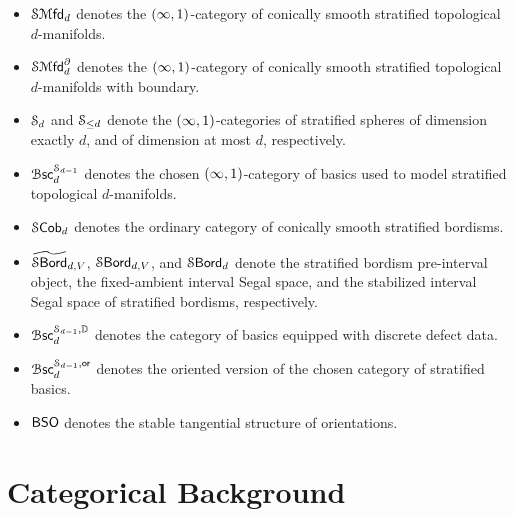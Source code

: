 \documentclass{amsbook}
\begin{document}
\begin{itemize}
    \item ${\mathcal S\!\operatorname{{\mathcal M}\mathsf{fd}}}_d$ denotes the $(\operatorname{\infty},1)$-category of conically smooth stratified topological $d$-manifolds.
    \item ${\mathcal S\!\operatorname{{\mathcal M}\mathsf{fd}}}_d^\partial$ denotes the $(\operatorname{\infty},1)$-category of conically smooth stratified topological $d$-manifolds with boundary.
    \item $\mathcal S_d$ and $\mathcal S_{\le d}$ denote the $(\operatorname{\infty},1)$-categories of stratified spheres of dimension exactly $d$, and of dimension at most $d$, respectively.
    \item $\operatorname{\mathcal B\mathsf{sc}}_d^{\mathcal S_{d-1}}$ denotes the chosen $(\operatorname{\infty},1)$-category of basics used to model stratified topological $d$-manifolds.
    \item $\mathcal S\mathsf{Cob}_d$ denotes the ordinary category of conically smooth stratified bordisms.
    \item $\operatorname{\widetilde{\mathcal S\mathsf{Bord}}}_{d,V}$, $\operatorname{\mathcal S\mathsf{Bord}}_{d,V}$, and $\operatorname{\mathcal S\mathsf{Bord}}_d$ denote the stratified bordism pre-interval object, the fixed-ambient interval Segal space, and the stabilized interval Segal space of stratified bordisms, respectively.
    \item $\operatorname{\mathcal B\mathsf{sc}}_d^{\mathcal S_{d-1},\mathbb D}$ denotes the category of basics equipped with discrete defect data.
    \item $\operatorname{\mathcal B\mathsf{sc}}_d^{\mathcal S_{d-1},\mathsf{or}}$ denotes the oriented version of the chosen category of stratified basics.
    \item $\mathsf B\mathsf S\mathsf O$ denotes the stable tangential structure of orientations.
    
\end{itemize}



\mainmatter
\raggedbottom



















\appendix



\iffalse




\chapter{Categorical Background}\label{sec:: ap: categorical_background}
\end{document}
